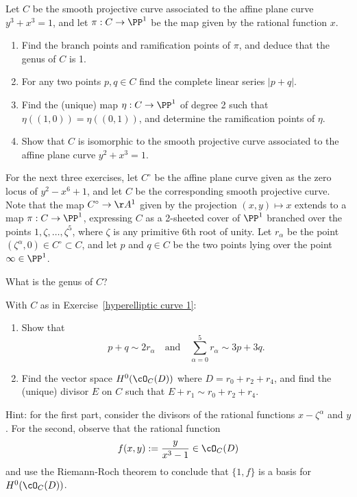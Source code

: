 \begin{exercise}
Let $C$ be the smooth projective curve associated to the affine plane curve $y^3 +x^3 = 1$, and let $\pi : C \to \PP^1$ be the map given by the rational function $x$.
\begin{enumerate}
\item Find the branch points and ramification points of $\pi$, and deduce that the genus of $C$ is 1.
\item For any two points $p, q \in C$ find the complete linear series $|p+q|$.
\item Find the (unique) map $\eta : C \to \PP^1$ of degree 2 such that $\eta((1,0)) = \eta((0,1))$, and determine the ramification points of $\eta$.
\item Show that $C$ is isomorphic to the smooth projective curve associated to the affine plane curve $y^2 +x^3 = 1$.
\end{enumerate}
\end{exercise}

For the next three exercises, let $C^\circ$ be the affine plane curve given as the zero locus of $y^2 - x^6 +1$, and let $C$ be the corresponding smooth projective curve. Note that the map $C^\circ \to \AA^1$ given by the projection $(x,y) \mapsto x$ extends to a map $\pi : C \to \PP^1$, expressing $C$ as a 2-sheeted cover of $\PP^1$ branched over the points $1, \zeta, \dots, \zeta^5$, where $\zeta$ is any primitive 6th root of unity. Let $r_\alpha$ be the point $(\zeta^\alpha, 0) \in C^\circ \subset C$, and  let $p$ and $q \in C$ be the two points lying over the point $\infty \in \PP^1$.

\begin{exercise}\label{hyperelliptic curve 1}
What is the genus of $C$?
\end{exercise}

\begin{exercise} With $C$ as in Exercise~\ref{hyperelliptic curve 1}:
\begin{enumerate}
\item Show that
$$
p+q \sim 2r_\alpha \quad \text{and} \quad \sum_{\alpha = 0}^5 r_\alpha \sim 3p+3q.
$$

\item Find the vector space $H^0(\cO_C(D))$ where $D = r_0 + r_2 + r_4$, and find the (unique) divisor $E$ on $C$ such that $E + r_1 \sim r_0 + r_2 + r_4$.

\end{enumerate}

Hint: for the first part, consider the divisors of the rational functions $x-\zeta^\alpha$ and $y$. For the second, observe that the rational function 
$$
f(x,y) := \frac{y}{x^3-1} \in \cO_C(D)
$$
 and use the Riemann-Roch theorem to conclude that $\{1,f\}$ is a basis for $H^0(\cO_C(D))$.
\end{exercise}


